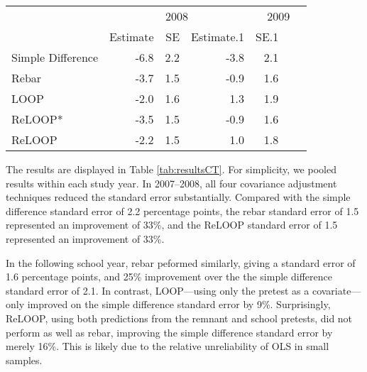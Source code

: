 \begin{table}[H]
\centering
\begin{tabular}{l|r|r|r|r}
\hline
\multicolumn{1}{c|}{ } & \multicolumn{3}{c|}{2008} & \multicolumn{3}{c}{2009} \\
\cline{2-4} \cline{5-7}
 & Estimate & SE & Estimate.1 & SE.1\\
\hline
Simple Difference & -6.8 & 2.2 & -3.8 & 2.1\\
\hline
Rebar & -3.7 & 1.5 & -0.9 & 1.6\\
\hline
LOOP & -2.0 & 1.6 & 1.3 & 1.9\\
\hline
ReLOOP* & -3.5 & 1.5 & -0.9 & 1.6\\
\hline
ReLOOP & -2.2 & 1.5 & 1.0 & 1.8\\
\hline
\end{tabular}
\end{table}



The results are displayed in Table \ref{tab:resultsCT}.
For simplicity, we pooled results within each study year.
In 2007--2008, all four covariance adjustment techniques reduced the
standard error substantially. Compared with the simple difference
standard error of 2.2 percentage points,
the rebar standard error of 1.5
represented an improvement of 33\%, and
the ReLOOP standard error of 1.5
represented an improvement of 33\%.

In the following school year, rebar peformed similarly, giving a
standard error of 1.6 percentage points, and
25\% improvement over the the simple
difference standard error of 2.1.
In contrast, LOOP---using only the pretest as a covariate---only
improved on the simple difference standard error by
9\%.
Surprisingly, ReLOOP, using both predictions from the remnant and
school pretests, did not perform as well as rebar, improving the
simple difference standard error by merely
16\%.
This is likely due to the relative unreliability of OLS in small samples.
